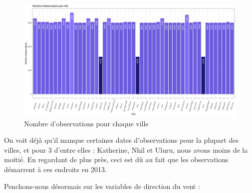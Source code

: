\documentclass{article}
\begin{document}
\begin{figure}[H]
    \centering
    \includegraphics[width=\textwidth]{Ressources/hist_observations_cities.pdf}
    \caption{Nombre d'observations pour chaque ville}
\end{figure}

On voit déjà qu'il manque certaines dates d'observations pour la plupart des villes, et pour 3 d'entre elles : Katherine, Nhil et Uluru, nous avons moins de la moitié. En regardant de plus près, ceci est dû au fait que les observations démarrent à ces endroits en 2013.

Penchons-nous désormais sur les variables de direction du vent : 

\begin{table}[H]
    \centering
    \caption{Variable WindGustDir}
\end{table}

\begin{table}[H]
    \centering
    \caption{Variable WindDir9am}
\end{table}
 
\end{document}
